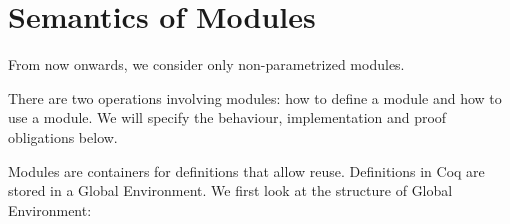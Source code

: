 
\section{Semantics of Modules}
\label{sec:semantics-of-modules}
From now onwards, we consider only non-parametrized modules.

There are two operations involving modules: how to define a module and how to
use a module. We will specify the behaviour, implementation and proof
obligations below.

Modules are containers for definitions that allow reuse. Definitions in Coq are
stored in a Global Environment. We first look at the structure of Global Environment:

